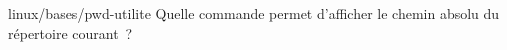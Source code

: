 \begin{question}{linux/bases/pwd-utilite}
  Quelle commande permet d'afficher le chemin absolu du répertoire
  courant~?
  \begin{reponses}
    \lastchoices
  \end{reponses}
\end{question}
